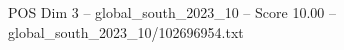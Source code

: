 \begin{textsample}{POS Dim 3 – global\_south\_2023\_10 – Score 10.00 – global\_south\_2023\_10/102696954.txt}
\end{textsample}
